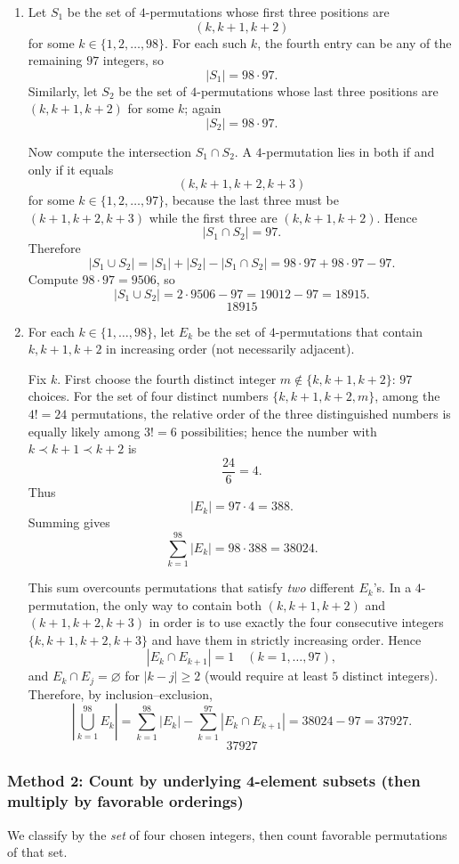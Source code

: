 \documentclass[12pt]{article}
\begin{document}
\begin{enumerate}[label=(\alph*)]
\item Let $S_1$ be the set of $4$-permutations whose first three positions are
\[
(k,k+1,k+2)
\]
for some $k\in\{1,2,\dots,98\}$. For each such $k$, the fourth entry can be any of the remaining $97$ integers, so
\[
|S_1| = 98\cdot 97.
\]
Similarly, let $S_2$ be the set of $4$-permutations whose last three positions are $(k,k+1,k+2)$ for some $k$; again
\[
|S_2| = 98\cdot 97.
\]

Now compute the intersection $S_1\cap S_2$. A $4$-permutation lies in both if and only if it equals
\[
(k,k+1,k+2,k+3)
\]
for some $k\in\{1,2,\dots,97\}$, because the last three must be $(k+1,k+2,k+3)$ while the first three are $(k,k+1,k+2)$. Hence
\[
|S_1\cap S_2| = 97.
\]
Therefore
\[
|S_1\cup S_2| = |S_1|+|S_2|-|S_1\cap S_2|
= 98\cdot 97 + 98\cdot 97 - 97.
\]
Compute $98\cdot 97 = 9506$, so
\[
|S_1\cup S_2| = 2\cdot 9506 - 97 = 19012 - 97 = 18915.
\]
\[
\boxed{18915}
\]

\item For each $k\in\{1,\dots,98\}$, let $E_k$ be the set of $4$-permutations that contain $k,k+1,k+2$ in increasing order (not necessarily adjacent).

Fix $k$. First choose the fourth distinct integer $m\notin\{k,k+1,k+2\}$: $97$ choices. For the set of four distinct numbers $\{k,k+1,k+2,m\}$, among the $4!=24$ permutations, the relative order of the three distinguished numbers is equally likely among $3!=6$ possibilities; hence the number with $k\prec k+1\prec k+2$ is
\[
\frac{24}{6}=4.
\]
Thus
\[
|E_k| = 97\cdot 4 = 388.
\]
Summing gives
\[
\sum_{k=1}^{98} |E_k| = 98\cdot 388 = 38024.
\]

This sum overcounts permutations that satisfy \emph{two} different $E_k$'s. In a $4$-permutation, the only way to contain both $(k,k+1,k+2)$ and $(k+1,k+2,k+3)$ in order is to use exactly the four consecutive integers $\{k,k+1,k+2,k+3\}$ and have them in strictly increasing order. Hence
\[
|E_k\cap E_{k+1}| = 1 \quad (k=1,\dots,97),
\]
and $E_k\cap E_j=\varnothing$ for $|k-j|\ge 2$ (would require at least $5$ distinct integers).
Therefore, by inclusion--exclusion,
\[
\left|\bigcup_{k=1}^{98} E_k\right|
= \sum_{k=1}^{98} |E_k| - \sum_{k=1}^{97} |E_k\cap E_{k+1}|
= 38024 - 97
= 37927.
\]
\[
\boxed{37927}
\]
\end{enumerate}

\subsubsection{Method 2: Count by underlying 4-element subsets (then multiply by favorable orderings)}
We classify by the \emph{set} of four chosen integers, then count favorable permutations of that set.
\end{document}
